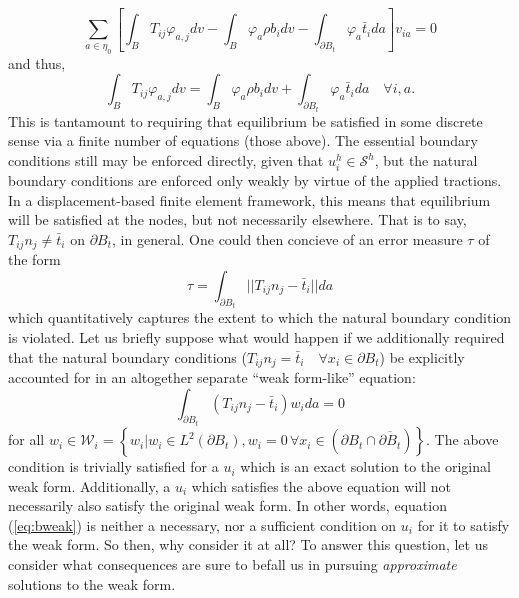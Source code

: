 \documentclass[11pt]{article} %
\begin{document}
\begin{equation}
	\sum_{a \in \eta_0} \left[ \int_B T_{ij} \varphi_{a,j} dv - \int_B \varphi_a \rho b_i dv - \int_{\partial B_t} \varphi_a \bar{t}_i da \right] v_{ia} = 0
\end{equation}
and thus,
\begin{equation}
	\int_B T_{ij} \varphi_{a,j} dv = \int_B \varphi_a \rho b_i dv + \int_{\partial B_t} \varphi_a \bar{t}_i da \quad \forall i,  a .
\end{equation}
This is tantamount to requiring that equilibrium be satisfied in some discrete sense via a finite number of equations (those above). The essential boundary conditions still may be enforced directly, given that $u^h_i \in \mathcal{S}^h$, but the natural boundary conditions are enforced only weakly by virtue of the applied tractions. In a displacement-based finite element framework, this means that equilibrium will be satisfied at the nodes, but not necessarily elsewhere. That is to say, $T_{ij} n_j \neq \bar{t}_i$ on $\partial B_t$, in general. One could then concieve of an error measure $\tau$ of the form
\begin{equation}
	\tau = \int_{\partial B_t} || T_{ij} n_j - \bar{t}_i || da
\end{equation}
which quantitatively captures the extent to which the natural boundary condition is violated. Let us briefly suppose what would happen if we additionally required that the natural boundary conditions ($T_{ij} n_j = \bar{t}_i \quad \forall x_i \in \partial B_t$) be explicitly accounted for in an altogether separate ``weak form-like'' equation:
\begin{equation}
	\int_{\partial B_t} (T_{ij} n_j - \bar{t}_i) w_i da = 0
	\label{eq:bweak}
\end{equation}
for all $w_i \in \mathcal{W}_i = \left\{ w_i | w_i \in L^2 (\partial B_t), w_i = 0 \, \forall x_i \in (\partial B_t \cap \overline{\partial B_t}) \right\}$. The above condition is trivially satisfied for a $u_i$ which is an exact solution to the original weak form. Additionally, a $u_i$ which satisfies the above equation will not necessarily also satisfy the original weak form. In other words, equation (\ref{eq:bweak}) is neither a necessary, nor a sufficient condition on $u_i$ for it to satisfy the weak form. So then, why consider it at all? To answer this question, let us consider what consequences are sure to befall us in pursuing \textit{approximate} solutions to the weak form.
\end{document}
